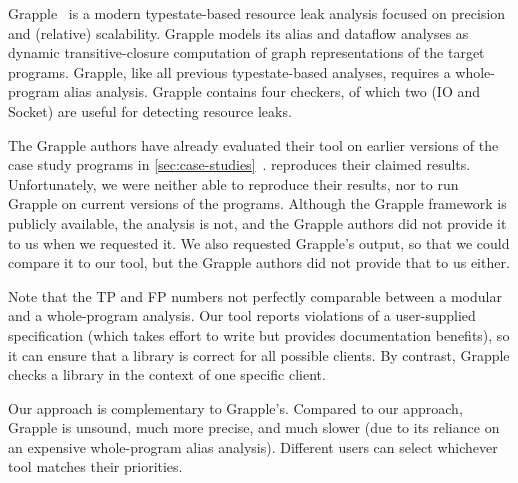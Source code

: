 Grapple~\cite{zuo2019grapple} is a modern typestate-based resource leak analysis
focused on precision and (relative) scalability. Grapple models its alias and
dataflow analyses as dynamic transitive-closure computation of graph
representations of the target programs. Grapple, like all previous
typestate-based analyses, requires a whole-program alias analysis. Grapple
contains four checkers, of which two (IO and Socket) are useful for detecting
resource leaks.

The Grapple authors have already evaluated their tool on earlier
versions
 of the case study programs in
\cref{sec:case-studies}~\cite{zuo2019grapple}.
 reproduces their claimed results.
Unfortunately, we were
neither able to reproduce their results, nor to run Grapple on current
versions of the programs.  Although the Grapple framework is publicly
available, the analysis is not, and the Grapple authors did not provide it
to us when we requested it.  We also requested Grapple's output, so that we
could compare it to our tool, but the Grapple authors did not provide that
to us either.

Note that the TP and FP numbers not perfectly comparable between a modular
and a whole-program analysis.
Our tool reports violations of a user-supplied specification
(which takes effort to write but provides documentation benefits), so it
can ensure that a library is correct for all possible clients.  By
contrast, Grapple checks a library in the context of one specific client.

Our approach is complementary to Grapple's.
Compared to our approach, Grapple is unsound, 
much more precise,
and much slower (due to its reliance on
an expensive whole-program alias analysis).
Different users can select whichever tool matches
their priorities.


